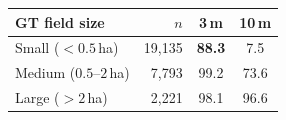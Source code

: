 \setlength{\tabcolsep}{6pt}
\begin{tabular}{@{}lrcc@{}}
\toprule
GT field size & $n$ & 3\,m & 10\,m \\
\midrule
Small ($<0.5$\,ha) & 19{,}135 & \textbf{88.3} & 7.5 \\
Medium ($0.5$--$2$\,ha) & 7{,}793 & 99.2 & 73.6 \\
Large ($>2$\,ha) & 2{,}221 & 98.1 & 96.6 \\
\bottomrule
\end{tabular}
